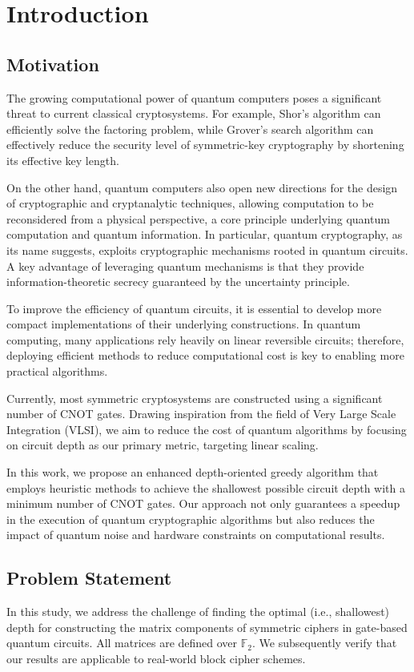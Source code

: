 \chapter{Introduction}
\label{ch:introduction}

\section{Motivation}
The growing computational power of quantum computers poses a significant threat to current classical cryptosystems. For example, Shor's algorithm can efficiently solve the factoring problem, while Grover's search algorithm can effectively reduce the security level of symmetric-key cryptography by shortening its effective key length.

On the other hand, quantum computers also open new directions for the design of cryptographic and cryptanalytic techniques, allowing computation to be reconsidered from a physical perspective, a core principle underlying quantum computation and quantum information. In particular, quantum cryptography, as its name suggests, exploits cryptographic mechanisms rooted in quantum circuits. A key advantage of leveraging quantum mechanisms is that they provide information-theoretic secrecy guaranteed by the uncertainty principle.

To improve the efficiency of quantum circuits, it is essential to develop more compact implementations of their underlying constructions. In quantum computing, many applications rely heavily on linear reversible circuits; therefore, deploying efficient methods to reduce computational cost is key to enabling more practical algorithms.

Currently, most symmetric cryptosystems are constructed using a significant number of CNOT gates. Drawing inspiration from the field of Very Large Scale Integration (VLSI), we aim to reduce the cost of quantum algorithms by focusing on circuit depth as our primary metric, targeting linear scaling.

In this work, we propose an enhanced depth-oriented greedy algorithm that employs heuristic methods to achieve the shallowest possible circuit depth with a minimum number of CNOT gates. Our approach not only guarantees a speedup in the execution of quantum cryptographic algorithms but also reduces the impact of quantum noise and hardware constraints on computational results.

\section{Problem Statement}
In this study, we address the challenge of finding the optimal (i.e., shallowest) depth for constructing the matrix components of symmetric ciphers in gate-based quantum circuits. All matrices are defined over $\mathbb{F}_{2}$. We subsequently verify that our results are applicable to real-world block cipher schemes.

